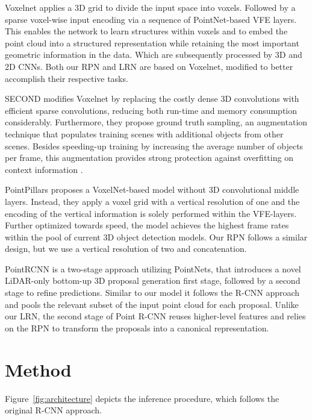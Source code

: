 \documentclass{article}
\begin{document}
Voxelnet \cite{Zhou2018voxel} applies a 3D grid to divide the input space into voxels. Followed by a  sparse voxel-wise input encoding via a sequence of PointNet-based VFE layers. 
This enables the network to learn structures within voxels and to embed the point cloud into a structured representation while retaining the most important geometric information in the data. Which are subsequently processed by 3D and 2D CNNs.
Both our RPN and LRN are based on Voxelnet, modified to better accomplish their respective tasks.

SECOND \cite{Yan2018second} modifies Voxelnet by replacing the costly dense 3D convolutions with efficient sparse convolutions, reducing both run-time and memory consumption considerably.
Furthermore, they propose ground truth sampling, an augmentation technique that populates training scenes with additional objects from other scenes.
Besides speeding-up training by increasing the average number of objects per frame, this augmentation provides strong protection against overfitting on context information \cite{Shi2019pointrcnn,Lang2019pointpillars}.

PointPillars \cite{Lang2019pointpillars} proposes a VoxelNet-based model without 3D convolutional middle layers. Instead, they apply a voxel grid with a vertical resolution of one and the encoding of the vertical information is solely performed within the VFE-layers. Further optimized towards speed, the model achieves the highest frame rates within the pool of current 3D object detection models. Our RPN follows a similar design, but we use a vertical resolution of two and concatenation.

PointRCNN \cite{Shi2019pointrcnn} is a two-stage approach utilizing PointNets, that introduces a novel LiDAR-only bottom-up 3D proposal generation first stage, followed by a second stage to refine predictions.
Similar to our model it follows the R-CNN approach and pools the relevant subset of the input point cloud for each proposal.
Unlike our LRN, the second stage of Point R-CNN reuses higher-level features and relies on the RPN to transform the proposals into a canonical representation.

\section{Method} \label{sec:method}

Figure~\ref{fig:architecture} depicts the inference procedure, which follows the original R-CNN \cite{Girshick2014rich} approach. 
\end{document}
